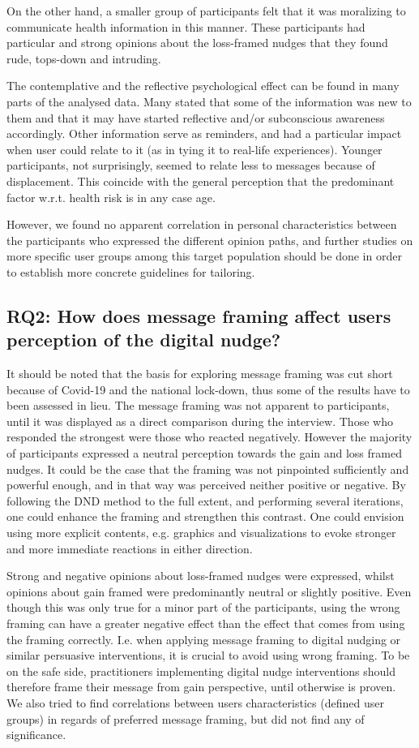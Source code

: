 On the other hand, a smaller group of participants felt that it was moralizing to communicate health information in this manner. These participants had particular and strong opinions about the loss-framed nudges that they found rude, tops-down and intruding.  

The contemplative and the reflective psychological effect can be found in many parts of the analysed data. Many stated that some of the information was new to them and that it may have started reflective and/or subconscious awareness accordingly. Other information serve as reminders, and had a particular impact when user could relate to it (as in tying it to real-life experiences). Younger participants, not surprisingly, seemed to relate less to messages because of displacement. This coincide with the general perception that the predominant factor w.r.t. health risk is in any case age.

However, we found no apparent correlation in personal characteristics between the participants who expressed the different opinion paths, and further studies on more specific user groups among this target population should be done in order to establish more concrete guidelines for tailoring. 

\subsection{RQ2: How does message framing affect users perception of the digital nudge?}

It should be noted that the basis for exploring message framing was cut short because of Covid-19 and the national lock-down, thus some of the results have to been assessed in lieu. The message framing was not apparent to participants, until it was displayed as a direct comparison during the interview. Those who responded the strongest were those who reacted negatively. However the majority of participants expressed a neutral perception towards the gain and loss framed nudges. It could be the case that the framing was not pinpointed sufficiently and powerful enough, and in that way was perceived neither positive or negative. By following the DND method to the full extent, and performing several iterations, one could enhance the framing and strengthen this contrast. One could envision using more explicit contents, e.g. graphics and visualizations to evoke stronger and more immediate reactions in either direction. 

Strong and negative opinions about loss-framed nudges were expressed, whilst opinions about gain framed were predominantly neutral or slightly positive. Even though this was only true for a minor part of the participants, using the wrong framing can have a greater negative effect than the effect that comes from using the framing correctly. I.e. when applying message framing to digital nudging or similar persuasive interventions, it is crucial to avoid using wrong framing. To be on the safe side, practitioners implementing digital nudge interventions should therefore frame their message from gain perspective, until otherwise is proven. We also tried to find correlations between users characteristics (defined user groups) in regards of preferred message framing, but did not find any of significance. 

